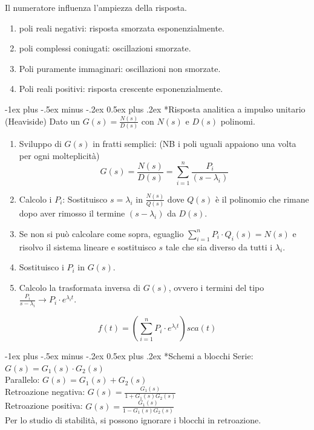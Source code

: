 \documentclass[10pt,landscape, a4paper]{scrartcl} %
\makeatletter
\renewcommand{\section}{\@startsection{section}{1}{0mm}%
                                {-1ex plus -.5ex minus -.2ex}%
                                {0.5ex plus .2ex}%
                                {\normalfont\large\bfseries}}
\makeatother
\begin{document}
\begin{multicols*}{3}
Il numeratore influenza l'ampiezza della risposta.
\begin{enumerate}
	\item poli reali negativi: risposta smorzata esponenzialmente.
	\item poli complessi coniugati: oscillazioni smorzate.
	\item Poli puramente immaginari: oscillazioni non smorzate.
	\item Poli reali positivi: risposta crescente esponenzialmente.
\end{enumerate}



\section*{Risposta analitica a impulso unitario (Heaviside)}
Dato un $G(s) = \frac{N(s)}{D(s)}$ con $N(s)$ e $D(s)$ polinomi.\\
\begin{enumerate}
	\item Sviluppo di $G(s)$ in fratti semplici: (NB i poli uguali appaiono una volta per ogni molteplicità)
	\begin{equation}
		G(s) = \frac{N(s)}{D(s)} = \sum_{i=1}^{n} \frac{P_i}{(s - \lambda_i)}
	\end{equation}
	\item Calcolo i $P_i$: Sostituisco $s = \lambda_i$ in $\frac{N(s)}{Q(s)}$ dove $Q(s)$ è il polinomio che rimane dopo aver rimosso il termine $(s - \lambda_i)$ da $D(s)$.
	\item Se non si può calcolare come sopra, eguaglio $\sum_{i=1}^{n} P_i\cdot Q_i(s) = N(s)$ e risolvo il sistema lineare e sostituisco $s$ tale che sia diverso da tutti i $\lambda_i$.
	\item Sostituisco i $P_i$ in $G(s)$.
	\item Calcolo la trasformata inversa di $G(s)$, ovvero i termini del tipo $\frac{P_i}{s - \lambda_i} \rightarrow P_i\cdot e^{\lambda_i t}$.
\end{enumerate}
\begin{equation}
	f(t) = \left(\sum_{i=1}^{n} P_i\cdot e^{\lambda_i t}\right)sca(t)
\end{equation}





\section*{Schemi a blocchi}
Serie: $G(s) = G_1(s)\cdot G_2(s)$\\
Parallelo: $G(s) = G_1(s) + G_2(s)$\\
Retroazione negativa: $G(s) = \frac{G_1(s)}{1 + G_1(s)G_2(s)}$\\
Retroazione positiva: $G(s) = \frac{G_1(s)}{1 - G_1(s)G_2(s)}$\\
Per lo studio di stabilità, si possono ignorare i blocchi in retroazione.


\end{multicols*}
\end{document}

